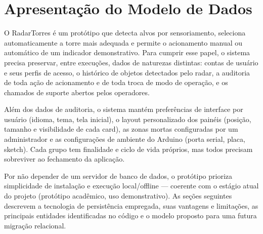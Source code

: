 

\section{Apresentação do Modelo de Dados}

O RadarTorres é um protótipo que detecta alvos por sensoriamento, seleciona automaticamente a
torre mais adequada e permite o acionamento manual ou automático de um indicador demonstrativo.
Para cumprir esse papel, o sistema precisa preservar, entre execuções, dados de naturezas
distintas: contas de usuário e seus perfis de acesso, o histórico de objetos detectados pelo
radar, a auditoria de toda ação de acionamento e de toda troca de modo de operação, e os
chamados de suporte abertos pelos operadores.

Além dos dados de auditoria, o sistema mantém preferências de interface por usuário (idioma,
tema, tela inicial), o layout personalizado dos painéis (posição, tamanho e visibilidade de cada
card), as zonas mortas configuradas por um administrador e as configurações de ambiente do
Arduino (porta serial, placa, sketch). Cada grupo tem finalidade e ciclo de vida próprios, mas
todos precisam sobreviver ao fechamento da aplicação.

Por não depender de um servidor de banco de dados, o protótipo prioriza simplicidade de
instalação e execução local/offline — coerente com o estágio atual do projeto (protótipo
acadêmico, uso demonstrativo). As seções seguintes descrevem a tecnologia de persistência
empregada, suas vantagens e limitações, as principais entidades identificadas no código e o
modelo proposto para uma futura migração relacional.

